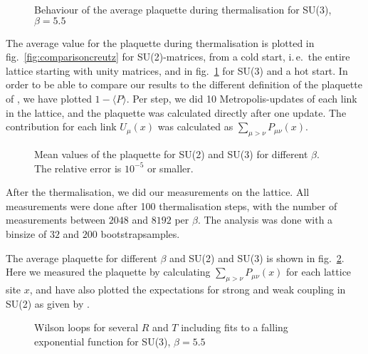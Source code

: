 \documentclass[%
 reprint,
 amsmath,amssymb,
 aps,
]{revtex4-1}
\begin{document}

\begin{figure}
	\centering
	
	\caption[Behaviour of the plaquette for SU(3)]{Behaviour of the average plaquette during thermalisation for SU(3), $\beta=5.5$}
	\label{fig:plaquettethermsu3}
\end{figure} 

The average value for the plaquette during thermalisation is plotted in fig.~\ref{fig:comparisoncreutz} for SU(2)-matrices, from a cold start, i.\,e.\, the entire lattice starting with unity matrices, and in fig.~\ref{fig:plaquettethermsu3} for SU(3) and a hot start. In order to be able to compare our results to the different definition of the plaquette of \citet{creutzsu2}, we have plotted $1-\langle P\rangle$. Per step, we did 10 Metropolis-updates of each link in the lattice, and the plaquette was calculated directly after one update. The contribution for each link $U_\mu(x)$ was calculated as $\sum_{\mu>\nu}P_{\mu\nu}(x)$.




\begin{figure}
	\centering
	
	\caption[Mean values of the plaquette]{Mean values of the plaquette for SU(2) and SU(3) for different $\beta$. The relative error is $10^{-5}$ or smaller.}
	\label{fig:plaquettetotal}
\end{figure}

After the thermalisation, we did our measurements on the lattice. All measurements were done after 100 thermalisation steps, with the number of measurements between $2048$ and $8192$ per $\beta$. The analysis was done with a binsize of $32$ and $200$ bootstrapsamples. 

The average plaquette for different $\beta$ and SU(2) and SU(3) is shown in fig.~\ref{fig:plaquettetotal}. Here we measured the plaquette by calculating $\sum_{\mu>\nu}P_{\mu\nu}(x)$ for each lattice site $x$, and have also plotted the expectations for strong and weak coupling in SU(2) as given by \citet{creutzsu2}.

\begin{figure}
	\centering
	
	\caption[Different Wilson loops for SU(3), $\beta=5.5$]{Wilson loops for several $R$ and $T$ including fits to a falling exponential function for SU(3), $\beta=5.5$}
	\label{fig:wilsonloopbeta5.5su3}
\end{figure} 
\end{document}
